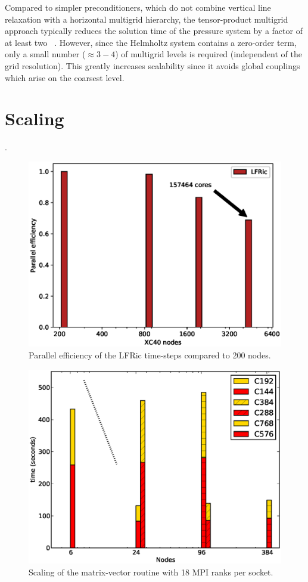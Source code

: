 \documentclass[times]{elsarticle}
\begin{document}
Compared to simpler preconditioners, which do not combine vertical
line relaxation with a horizontal multigrid hierarchy, the
tensor-product multigrid approach typically reduces the solution time
of the pressure system by a factor of at least two
~\cite{Mueller2014,Mitchell2016}. However, since the Helmholtz system
contains a zero-order term, only a small number ($\approx 3-4$) of
multigrid levels is required (independent of the grid
resolution). This greatly increases scalability since it avoids global
couplings which arise on the coarsest level.

\section{\label{sec:scal}Scaling}.
\begin{figure}
  \begin{center}
    \includegraphics[width=0.9\linewidth]{scale.eps}
    \caption{\label{fig:scale_PE}Parallel efficiency of the LFRic 
      time-steps compared to 200 nodes.}
  \end{center}
\end{figure}

\begin{figure}
  \begin{center}
    \includegraphics[width=0.9\linewidth]{strong_mv_T1.eps}
    \caption{\label{fig:scale_T1}Scaling of the matrix-vector routine 
      with 18 MPI ranks per socket.}
  \end{center}
\end{figure}
\end{document}
